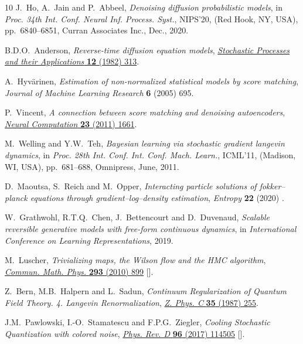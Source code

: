\begin{thebibliography}{10}
J.~Ho, A.~Jain and P.~Abbeel, \emph{Denoising diffusion probabilistic models},
  in \emph{Proc. 34th {{Int}}. {{Conf}}. {{Neural Inf}}. {{Process}}.
  {{Syst}}.}, {{NIPS}}'20, ({Red Hook, NY, USA}), pp.~6840--6851, {Curran
  Associates Inc.}, Dec., 2020.

B.D.O.~Anderson, \emph{Reverse-time diffusion equation models},
  \href{https://doi.org/10.1016/0304-4149(82)90051-5}{\emph{Stochastic
  Processes and their Applications} {\bfseries 12} (1982) 313}.

A.~Hyv{{\"a}}rinen, \emph{Estimation of non-normalized statistical models by
  score matching}, {\emph{Journal of Machine Learning Research} {\bfseries 6}
  (2005) 695}.

P.~Vincent, \emph{A connection between score matching and denoising
  autoencoders}, \href{https://doi.org/10.1162/NECO_a_00142}{\emph{Neural
  Computation} {\bfseries 23} (2011) 1661}.

M.~Welling and Y.W.~Teh, \emph{Bayesian learning via stochastic gradient
  langevin dynamics},  in \emph{Proc. 28th {{Int}}. {{Conf}}. {{Int}}.
  {{Conf}}. {{Mach}}. {{Learn}}.}, {{ICML}}'11, ({Madison, WI, USA}),
  pp.~681--688, {Omnipress}, June, 2011.

D.~Maoutsa, S.~Reich and M.~Opper, \emph{Interacting particle solutions of
  fokker–planck equations through gradient–log–density estimation},
  {\emph{Entropy} {\bfseries 22} (2020) }.

W.~Grathwohl, R.T.Q.~Chen, J.~Bettencourt and D.~Duvenaud, \emph{Scalable
  reversible generative models with free-form continuous dynamics},  in
  \emph{International Conference on Learning Representations}, 2019.

M.~Luscher, \emph{{Trivializing maps, the Wilson flow and the HMC algorithm}},
  \href{https://doi.org/10.1007/s00220-009-0953-7}{\emph{Commun. Math. Phys.}
  {\bfseries 293} (2010) 899}
  [\href{https://arxiv.org/abs/0907.5491}{{}}].

Z.~Bern, M.B.~Halpern and L.~Sadun, \emph{{Continuum Regularization of Quantum
  Field Theory. 4. Langevin Renormalization}},
  \href{https://doi.org/10.1007/BF01408455}{\emph{Z. Phys. C} {\bfseries 35}
  (1987) 255}.

J.M.~Pawlowski, I.-O.~Stamatescu and F.P.G.~Ziegler, \emph{{Cooling Stochastic
  Quantization with colored noise}},
  \href{https://doi.org/10.1103/PhysRevD.96.114505}{\emph{Phys. Rev. D}
  {\bfseries 96} (2017) 114505}
  [\href{https://arxiv.org/abs/1705.06231}{{}}].


\end{thebibliography}
